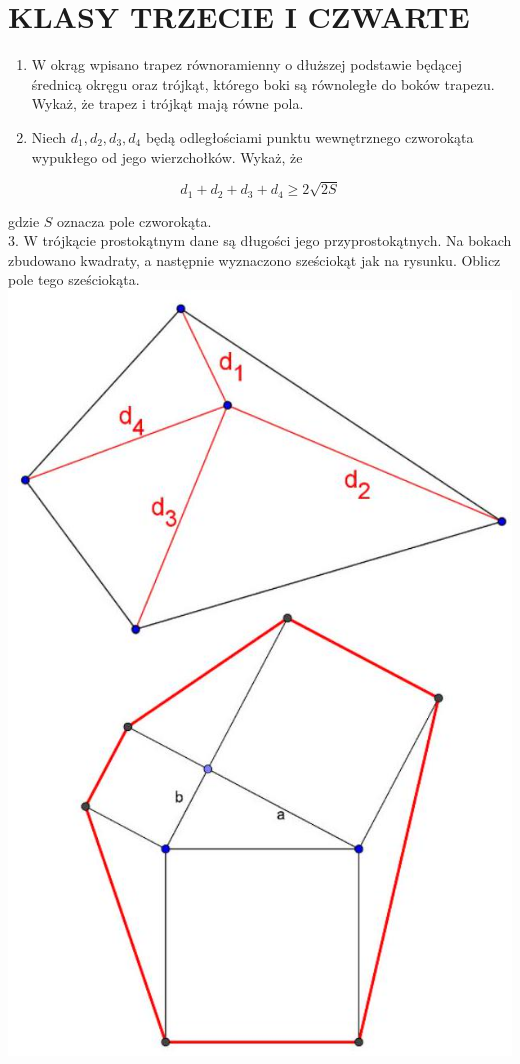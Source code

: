 \documentclass[10pt]{article}
\begin{document}
\section*{KLASY TRZECIE I CZWARTE}
\begin{enumerate}
  \item W okrąg wpisano trapez równoramienny o dłuższej podstawie będącej średnicą okręgu oraz trójkąt, którego boki są równoległe do boków trapezu. Wykaż, że trapez i trójkąt mają równe pola.
  \item Niech \(d_{1}, d_{2}, d_{3}, d_{4}\) będą odległościami punktu wewnętrznego czworokąta wypukłego od jego wierzchołków. Wykaż, że
\end{enumerate}

\[
d_{1}+d_{2}+d_{3}+d_{4} \geq 2 \sqrt{2 S}
\]

gdzie \(S\) oznacza pole czworokąta.\\
3. W trójkącie prostokątnym dane są długości jego przyprostokątnych. Na bokach zbudowano kwadraty, a następnie wyznaczono sześciokąt jak na rysunku. Oblicz pole tego sześciokąta.\\
\includegraphics[max width=\textwidth, center]{2024_11_21_59b0c2c0bc9b0a979429g-1(1)}
\end{document}
